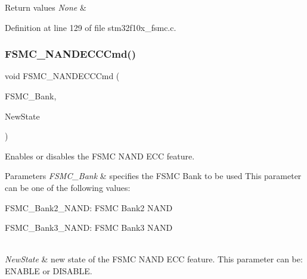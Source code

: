 \begin{DoxyRetVals}{Return values}
{\em None} & \\
\hline
\end{DoxyRetVals}


Definition at line 129 of file stm32f10x\+\_\+fsmc.\+c.

\mbox{\label{group___f_s_m_c___exported___functions_ga5800301fc39bbe998a18ebd9ff191cdc}} 
\subsubsection{\texorpdfstring{F\+S\+M\+C\+\_\+\+N\+A\+N\+D\+E\+C\+C\+Cmd()}{FSMC\_NANDECCCmd()}}
{\footnotesize\ttfamily void F\+S\+M\+C\+\_\+\+N\+A\+N\+D\+E\+C\+C\+Cmd (\begin{DoxyParamCaption}\item[{uint32\+\_\+t}]{F\+S\+M\+C\+\_\+\+Bank,  }\item[{\hyperlink{group___exported__types_gac9a7e9a35d2513ec15c3b537aaa4fba1}{Functional\+State}}]{New\+State }\end{DoxyParamCaption})}



Enables or disables the F\+S\+MC N\+A\+ND E\+CC feature. 


\begin{DoxyParams}{Parameters}
{\em F\+S\+M\+C\+\_\+\+Bank} & specifies the F\+S\+MC Bank to be used This parameter can be one of the following values\+: \begin{DoxyItemize}
\item F\+S\+M\+C\+\_\+\+Bank2\+\_\+\+N\+A\+ND\+: F\+S\+MC Bank2 N\+A\+ND \item F\+S\+M\+C\+\_\+\+Bank3\+\_\+\+N\+A\+ND\+: F\+S\+MC Bank3 N\+A\+ND \end{DoxyItemize}
\\
\hline
{\em New\+State} & new state of the F\+S\+MC N\+A\+ND E\+CC feature. This parameter can be\+: E\+N\+A\+B\+LE or D\+I\+S\+A\+B\+LE. \\
\hline
\end{DoxyParams}

